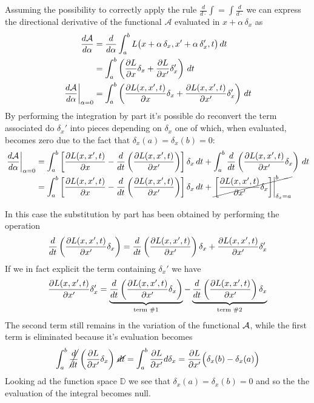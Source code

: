 Assuming the possibility to correctly apply the rule $\frac{d}{d\cdot} \int = \int \frac{d}{d\cdot}$ we can express the directional derivative of the functional $\mathcal A$ evaluated in $x+ \alpha\, \delta_x$ as
\begin{align*}
	\frac{d\mathcal A}{d\alpha} & = \frac{d}{d\alpha} \int_a^b L \big( x + \alpha\, \delta_x ,x' + \alpha\, \delta_x', t\big)\, dt \\
	& = \int_a^b \left(\frac{\partial L }{\partial x} \delta_x + \frac{\partial L }{\partial x'} \delta_x'\right)\, dt \\
	\left. \frac{d\mathcal A}{d\alpha} \right|_{\alpha = 0} & = \int_a^b \left( \frac{\partial L (x,x',t)}{\partial x} \delta_x + \frac{\partial L (x,x',t)}{\partial x'} \delta_x' \right)\, dt 
\end{align*}
By performing the integration by part it's possible do reconvert the term associated do $\delta_x'$ into pieces depending on $\delta_x$ one of which, when evaluated, becomes zero due to the fact that $\delta_x(a) = \delta_x(b) = 0$:
\begin{align*}
	\left. \frac{d\mathcal A}{d\alpha} \right|_{\alpha = 0} & = \int_a^b \left[ \frac{\partial L (x,x',t)}{\partial x} - \frac{d}{dt} \left( \frac{\partial L (x,x',t)}{\partial x'} \right) \right] \delta_x\, dt + \int_a^b\frac{d}{dt}\left( \frac{\partial L (x,x',t)}{\partial x'}\delta_x \right) \, dt \\
	& = \int_a^b \left[ \frac{\partial L (x,x',t)}{\partial x} - \frac{d}{dt} \left( \frac{\partial L (x,x',t)}{\partial x'} \right) \right] \delta_x\, dt + \cancel{\left. \left[ \frac{\partial L (x,x',t)}{\partial x'}\delta_x \right] \right|_{\delta_x = a}^b} \\
\end{align*}

\begin{note}
	In this case the substitution by part has been obtained by performing the operation
	\[ \frac d {dt} \left( \frac{\partial L(x,x',t)}{\partial x'} \delta_x \right) = \frac d{dt} \left( \frac{\partial L(x,x',t)}{\partial x'}\right) \delta_x + \frac{\partial L(x,x',t)}{\partial x'} \delta_x' \]
	If we in fact explicit the term containing $\delta_x'$ we have
	\[ \frac{\partial L(x,x',t)}{\partial x'} \delta_x' = \underbrace{\frac d {dt} \left( \frac{\partial L(x,x',t)}{\partial x'} \delta_x \right)}_\textrm{term \#1} - \underbrace{\frac d{dt} \left( \frac{\partial L(x,x',t)}{\partial x'}\right) \delta_x}_\textrm{term \#2} \]
	The second term still remains in the variation of the functional $\mathcal{A}$, while the first term is eliminated because it's evaluation becomes
	\[ \int_a^b\cancel{\frac{d}{dt}}\left( \frac{\partial L}{\partial x'}\delta_x \right) \,\cancel{dt} = \int_a^b \frac{\partial L}{\partial x'} d\delta_x = \frac{\partial L}{\partial x'} \Big(\delta_x(b) - \delta_x(a)\Big)  \]
	Looking ad the function space $\mathds D$ we see that $\delta_x(a) = \delta_x(b) = 0$ and so the the evaluation of the integral becomes null.
\end{note}

